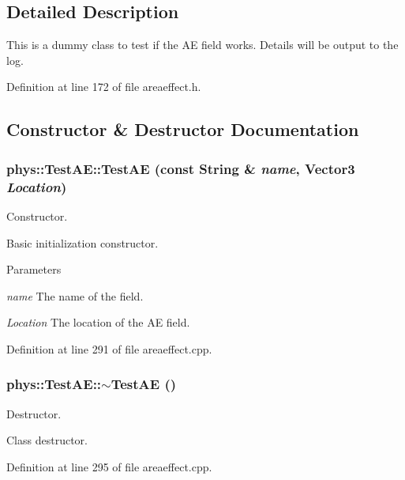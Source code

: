 \subsection{Detailed Description}
This is a dummy class to test if the AE field works. Details will be output to the log. 

Definition at line 172 of file areaeffect.h.



\subsection{Constructor \& Destructor Documentation}
\hypertarget{classphys_1_1TestAE_a851bf73722a9b3a3886e1dbf4600861c}{
\subsubsection[{TestAE}]{\setlength{\rightskip}{0pt plus 5cm}phys::TestAE::TestAE (const {\bf String} \& {\em name}, \/  {\bf Vector3} {\em Location})}}
\label{d1/dca/classphys_1_1TestAE_a851bf73722a9b3a3886e1dbf4600861c}


Constructor. 

Basic initialization constructor. 
\begin{DoxyParams}{Parameters}
\item[{\em name}]The name of the field. \item[{\em Location}]The location of the AE field. \end{DoxyParams}


Definition at line 291 of file areaeffect.cpp.

\hypertarget{classphys_1_1TestAE_aa3ceb77df713b5cafa97495de61e4b0a}{
\subsubsection[{$\sim$TestAE}]{\setlength{\rightskip}{0pt plus 5cm}phys::TestAE::$\sim$TestAE ()}}
\label{d1/dca/classphys_1_1TestAE_aa3ceb77df713b5cafa97495de61e4b0a}


Destructor. 

Class destructor. 

Definition at line 295 of file areaeffect.cpp.



